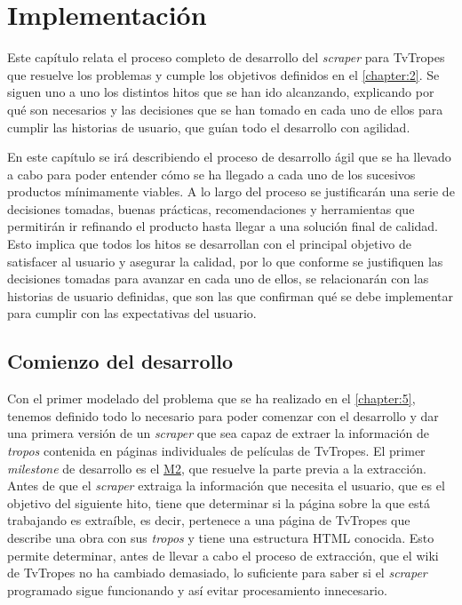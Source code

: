\chapter{Implementación}
\label{chapter:6}

Este capítulo relata el proceso completo de desarrollo del \textit{scraper} para
TvTropes que resuelve los problemas y cumple los objetivos definidos en el
\autoref{chapter:2}. Se siguen uno a uno los distintos hitos que se han ido
alcanzando, explicando por qué son necesarios y las decisiones que se han tomado
en cada uno de ellos para cumplir las historias de usuario, que guían todo el
desarrollo con agilidad.

En este capítulo se irá describiendo el proceso de desarrollo ágil que se ha
llevado a cabo para poder entender cómo se ha llegado a cada uno de los
sucesivos productos mínimamente viables. A lo largo del proceso se justificarán
una serie de decisiones tomadas, buenas prácticas, recomendaciones y
herramientas que permitirán ir refinando el producto hasta llegar a una solución
final de calidad. Esto implica que todos los hitos se desarrollan con el
principal objetivo de satisfacer al usuario y asegurar la calidad, por lo que
conforme se justifiquen las decisiones tomadas para avanzar en cada uno de
ellos, se relacionarán con las historias de usuario definidas, que son las que
confirman qué se debe implementar para cumplir con las expectativas del usuario.

\section{Comienzo del desarrollo}
Con el primer modelado del problema que se ha realizado en el
\autoref{chapter:5}, tenemos definido todo lo necesario para poder comenzar con
el desarrollo y dar una primera versión de un \textit{scraper} que sea capaz de
extraer la información de \textit{tropos} contenida en páginas individuales de
películas de TvTropes. El primer \textit{milestone} de desarrollo es el
\href{https://github.com/jlgallego99/TropesToGo/milestone/3}{M2}, que resuelve
la parte previa a la extracción. Antes de que el \textit{scraper} extraiga la
información que necesita el usuario, que es el objetivo del siguiente hito,
tiene que determinar si la página sobre la que está trabajando es extraíble, es
decir, pertenece a una página de TvTropes que describe una obra con sus
\textit{tropos} y tiene una estructura HTML conocida. Esto permite determinar,
antes de llevar a cabo el proceso de extracción, que el wiki de TvTropes no ha
cambiado demasiado, lo suficiente para saber si el \textit{scraper} programado
sigue funcionando y así evitar procesamiento innecesario. 


